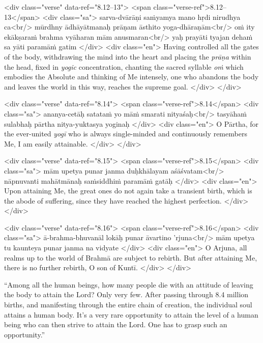 \begin{html}
<div class="verse" data-ref="8.12–13">
  <span class="verse-ref">8.12–13</span>
  <div class="sa">
    sarva-dvārāṇi saṁyamya mano hṛdi nirudhya ca<br/>
    mūrdhny ādhāyātmanaḥ prāṇam āsthito yoga-dhāraṇām<br/>
    oṁ ity ekākṣaraṁ brahma vyāharan mām anusmaran<br/>
    yaḥ prayāti tyajan dehaṁ sa yāti paramāṁ gatim
  </div>
  <div class="en">
    Having controlled all the gates of the body, withdrawing the mind into the heart and placing the \textit{prāṇa} within the head, fixed in \textit{yogic} concentration, chanting the sacred syllable \textit{oṁ} which embodies the Absolute and thinking of Me intensely, one who abandons the body and leaves the world in this way, reaches the supreme goal.
  </div>
</div>
\end{html}



\begin{html}
<div class="verse" data-ref="8.14">
  <span class="verse-ref">8.14</span>
  <div class="sa">
    ananya-cetāḥ satataṁ yo māṁ smarati nityaśaḥ<br/>
    tasyāhaṁ sulabhaḥ pārtha nitya-yuktasya yoginaḥ
  </div>
  <div class="en">
    O Pārtha, for the ever-united \textit{yogī} who is always single-minded and continuously remembers Me, I am easily attainable.
  </div>
</div>
\end{html}



\begin{html}
<div class="verse" data-ref="8.15">
  <span class="verse-ref">8.15</span>
  <div class="sa">
    mām upetya punar janma duḥkhālayam aśāśvatam<br/>
    nāpnuvanti mahātmānaḥ saṁsiddhiṁ paramāṁ gatāḥ
  </div>
  <div class="en">
    Upon attaining Me, the great ones do not again take a transient birth, which is the abode of suffering, since they have reached the highest perfection.
  </div>
</div>
\end{html}



\begin{html}
<div class="verse" data-ref="8.16">
  <span class="verse-ref">8.16</span>
  <div class="sa">
    ā-brahma-bhuvanāl lokāḥ punar āvartino ’rjuna<br/>
    mām upetya tu kaunteya punar janma na vidyate
  </div>
  <div class="en">
    O Arjuna, all realms up to the world of Brahmā are subject to rebirth. But after attaining Me, there is no further rebirth, O son of Kuntī.
  </div>
</div>
\end{html}


\enquote{Among all the human beings, how many people die with an attitude of leaving the body to attain the Lord? Only very few. After passing through 8.4 million births, and manifesting through the entire chain of creation, the individual soul attains a human body. It’s a very rare opportunity to attain the level of a human being who can then strive to attain the Lord. One has to grasp such an opportunity.}

